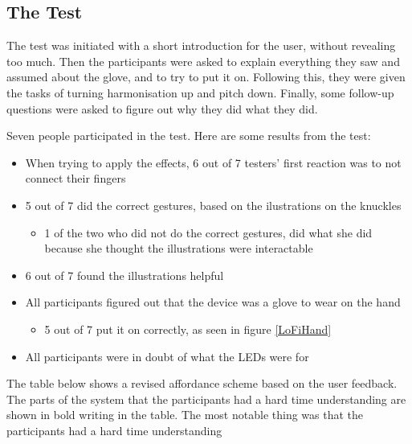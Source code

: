 \subsection{The Test}

The test was initiated with a short introduction for the user, without revealing too much. Then the participants were asked to explain everything they saw and assumed about the glove, and to try to put it on. Following this, they were given the tasks of turning harmonisation up and pitch down. Finally, some follow-up questions were asked to figure out why they did what they did.

Seven people participated in the test. Here are some results from the test:

\begin{itemize}
	\item When trying to apply the effects, 6 out of 7 testers' first reaction was to not connect their fingers
	\item 5 out of 7 did the correct gestures, based on the ilustrations on the knuckles
	\begin{itemize}
		\item 1 of the two who did not do the correct gestures, did what she did because she thought the illustrations were interactable
	\end{itemize}
	\item 6 out of 7 found the illustrations helpful
	\item All participants figured out that the device was a glove to wear on the hand
	\begin{itemize}
		\item 5 out of 7 put it on correctly, as seen in figure \ref{LoFiHand}
	\end{itemize}
	\item All participants were in doubt of what the LEDs were for
\end{itemize}

The table below shows a revised affordance scheme based on the user feedback. The parts of the system that the participants had a hard time understanding are shown in bold writing in the table. The most notable thing was that the participants had a hard time understanding 